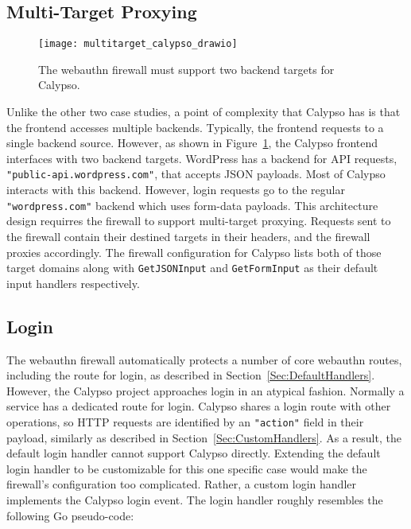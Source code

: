 \subsection{Multi-Target Proxying}

\begin{figure}[h]
  \centering
  \texttt{[image: multitarget\_calypso\_drawio]}
  \caption{The webauthn firewall must support two backend targets for Calypso.}
  \label{Fig:MultiTargetCalypso}
\end{figure}

Unlike the other two case studies, a point of complexity that Calypso has is that the frontend accesses multiple backends. Typically, the frontend requests to a single backend source. However, as shown in Figure~\ref{Fig:MultiTargetCalypso}, the Calypso frontend interfaces with two backend targets. WordPress has a backend for API requests, \lstinline{"public-api.wordpress.com"}, that accepts JSON payloads. Most of Calypso interacts with this backend. However, login requests go to the regular \lstinline{"wordpress.com"} backend which uses form-data payloads. This architecture design requirres the firewall to support multi-target proxying. Requests sent to the firewall contain their destined targets in their headers, and the firewall proxies accordingly. The firewall configuration for Calypso lists both of those target domains along with \lstinline{GetJSONInput} and \lstinline{GetFormInput} as their default input handlers respectively. 

\subsection{Login}\label{Sec:CalypsoLogin}

The webauthn firewall automatically protects a number of core webauthn routes, including the route for login, as described in Section~\ref{Sec:DefaultHandlers}. However, the Calypso project approaches login in an atypical fashion. Normally a service has a dedicated route for login. Calypso shares a login route with other operations, so HTTP requests are identified by an \lstinline{"action"} field in their payload, similarly as described in Section~\ref{Sec:CustomHandlers}. As a result, the default login handler cannot support Calypso directly. Extending the default login handler to be customizable for this one specific case would make the firewall's configuration too complicated. Rather, a custom login handler implements the Calypso login event. The login handler roughly resembles the following Go pseudo-code:

